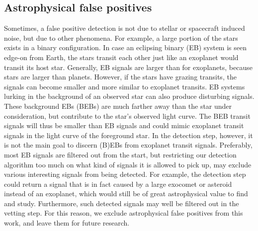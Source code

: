 \subsection{Astrophysical false positives}

Sometimes, a false positive detection is not due to stellar or spacecraft induced noise, but due to other phenomena. For example, a large portion of the stars exists in a binary configuration. In case an eclipsing binary (EB) system is seen edge-on from Earth, the stars transit each other just like an exoplanet would transit its host star. Generally, EB signals are larger than for exoplanets, because stars are larger than planets. However, if the stars have grazing transits, the signals can become smaller and more similar to exoplanet transits. EB systems lurking in the background of an observed star can also produce disturbing signals. These background EBs (BEBs) are much farther away than the star under consideration, but contribute to the star's observed light curve. The BEB transit signals will thus be smaller than EB signals and could mimic exoplanet transit signals in the light curve of the foreground star. In the detection step, however, it is not the main goal to discern (B)EBs from exoplanet transit signals. Preferably, most EB signals are filtered out from the start, but restricting our detection algorithm too much on what kind of signals it is allowed to pick up, may exclude various interesting signals from being detected. For example, the detection step could return a signal that is in fact caused by a large exocomet or asteroid instead of an exoplanet, which would still be of great astrophysical value to find and study. Furthermore, such detected signals may well be filtered out in the vetting step. For this reason, we exclude astrophysical false positives from this work, and leave them for future research.